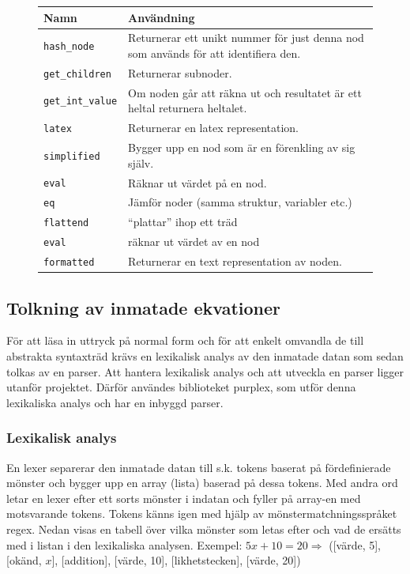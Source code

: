\documentclass[12pt,a4paper]{article}
\begin{document}
\begin{figure}[h!]
  \centering
  \begin{tabular}{l|p{10cm}}
    \textbf{Namn} & \textbf{Användning} \\
    \hline
    \texttt{hash\_node} & Returnerar ett unikt nummer för just denna nod som används för att identifiera den. \\
    \texttt{get\_children} & Returnerar subnoder. \\
    \texttt{get\_int\_value} & Om noden går att räkna ut och resultatet är ett heltal returnera heltalet. \\
    \texttt{latex} & Returnerar en latex representation. \\
    \texttt{simplified} & Bygger upp en nod som är en förenkling av sig själv. \\
    \texttt{eval} & Räknar ut värdet på en nod. \\
    \texttt{eq} & Jämför noder (samma struktur, variabler etc.) \\
    \texttt{flattend} & ``plattar'' ihop ett träd \\
    \texttt{eval} & räknar ut värdet av en nod \\
    \texttt{formatted} & Returnerar en text representation av noden.
  \end{tabular}
   \label{tab:basenodefunc}
\end{figure}

\subsection{Tolkning av inmatade ekvationer}
För att läsa in uttryck på normal form och för att enkelt omvandla de till abstrakta syntaxträd krävs en lexikalisk analys av den inmatade datan som sedan tolkas av en parser. Att hantera lexikalisk analys och att utveckla en parser ligger utanför projektet. Därför användes biblioteket purplex, som utför denna lexikaliska analys och har en inbyggd parser.

\subsubsection{Lexikalisk analys}
\label{subsubsec:lexikaliskanal}
En lexer separerar den inmatade datan till s.k. tokens baserat på fördefinierade mönster och bygger upp en array (lista) baserad på dessa tokens. Med andra ord letar en lexer efter ett sorts mönster i indatan och fyller på array-en med motsvarande tokens. Tokens känns igen med hjälp av mönstermatchningsspråket regex. Nedan visas en tabell över vilka mönster som letas efter och vad de ersätts med i listan i den lexikaliska analysen. 
Exempel: \(5x+10=20\Rightarrow\) ([värde, 5], [okänd, \(x\)], [addition], [värde, 10], [likhetstecken], [värde, 20])
\end{document}
